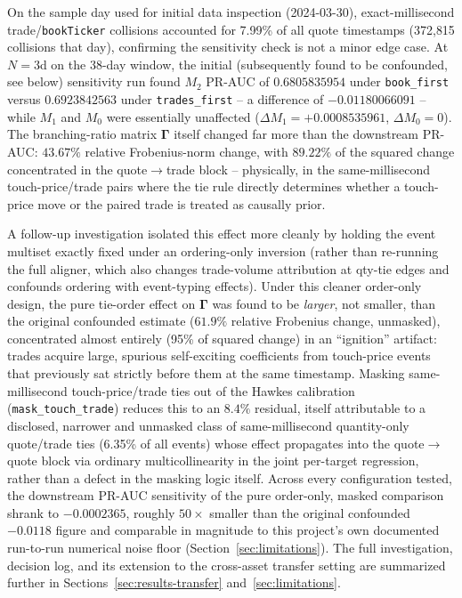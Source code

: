 On the sample day used for initial data inspection (2024-03-30),
exact-millisecond trade/\texttt{bookTicker} collisions accounted for
7.99\% of all quote timestamps (372{,}815 collisions that day), confirming
the sensitivity check is not a minor edge case. At $N=3$d on the 38-day
window, the initial (subsequently found to be confounded, see below)
sensitivity run found $M_2$ PR-AUC of $0.6805835954$ under
\texttt{book\_first} versus $0.6923842563$ under \texttt{trades\_first} --
a difference of $-0.01180066091$ -- while $M_1$ and $M_0$ were essentially
unaffected ($\Delta M_1 = +0.0008535961$, $\Delta M_0 = 0$). The
branching-ratio matrix $\boldsymbol{\Gamma}$ itself changed far more than
the downstream PR-AUC: $43.67\%$ relative Frobenius-norm change, with
$89.22\%$ of the squared change concentrated in the quote$\to$trade
block -- physically, in the same-millisecond touch-price/trade pairs
where the tie rule directly determines whether a touch-price move or the
paired trade is treated as causally prior.

A follow-up investigation isolated this effect more cleanly by holding
the event multiset exactly fixed under an ordering-only inversion (rather
than re-running the full aligner, which also changes trade-volume
attribution at qty-tie edges and confounds ordering with event-typing
effects). Under this cleaner order-only design, the pure tie-order effect
on $\boldsymbol{\Gamma}$ was found to be \emph{larger}, not smaller, than
the original confounded estimate ($61.9\%$ relative Frobenius change,
unmasked), concentrated almost entirely (95\% of squared change) in an
``ignition'' artifact: trades acquire large, spurious self-exciting
coefficients from touch-price events that previously sat strictly before
them at the same timestamp. Masking same-millisecond touch-price/trade
ties out of the Hawkes calibration (\texttt{mask\_touch\_trade}) reduces
this to an $8.4\%$ residual, itself attributable to a disclosed,
narrower and unmasked class of same-millisecond quantity-only quote/trade
ties (6.35\% of all events) whose effect propagates into the
quote$\to$quote block via ordinary multicollinearity in the joint
per-target regression, rather than a defect in the masking logic itself.
Across every configuration tested, the downstream PR-AUC sensitivity of
the pure order-only, masked comparison shrank to $-0.0002365$, roughly
$50\times$ smaller than the original confounded $-0.0118$ figure and
comparable in magnitude to this project's own documented run-to-run
numerical noise floor (Section~\ref{sec:limitations}). The full
investigation, decision log, and its extension to the cross-asset
transfer setting are summarized further in
Sections~\ref{sec:results-transfer} and~\ref{sec:limitations}.

